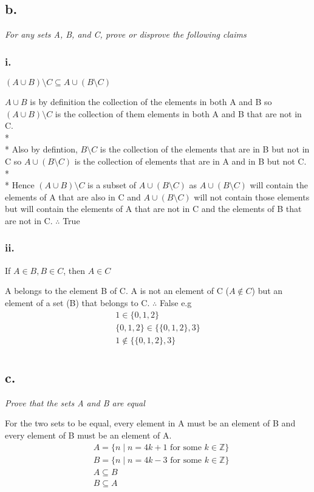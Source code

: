 \documentclass[a4paper, 12pt]{article}
\begin{document}
\subsection*{b.}
\begin{center} \textit{For any sets A, B, and C, prove or disprove the following claims} \end{center}
\subsubsection*{i.}
\begin{center} $(A \cup B) \setminus C \subseteq A \cup (B \setminus C)$ \end{center}
$A \cup B$ is by definition the collection of the elements in both A and B so $(A \cup B) \setminus C$ 
is the collection of them elements in both A and B that are not in C. 
\\*
\\*
Also by defintion, $B \setminus C$ is the collection of the elements that are in B but not in C so $A \cup (B \setminus C)$
is the collection of elements that are in A and in B but not C. 
\\*
\\*
Hence $(A \cup B) \setminus C$ is a subset of $A \cup (B \setminus C)$ as $A \cup (B \setminus C)$ will
contain the elements of A that are also in C and $A \cup (B \setminus C)$ will not contain those elements
but will contain the elements of A that are not in C and the elements of B that are not in C. $\therefore$ True

\subsubsection*{ii.}
\begin{center} If $A \in B, B \in C$, then $A \in C$ \end{center}
A belongs to the element B of C. A is not an element of C ($A \notin C$) but an element of a set (B) that belongs to C. $\therefore$ False
e.g
\begin{align*}
    1 \in \{0,1,2\} \\
    \{0,1,2\} \in \{\{0,1,2\}, 3\} \\
    1 \notin \{\{0,1,2\}, 3\} \\
\end{align*}

\newpage
\subsection*{c.}
\begin{center} \textit{Prove that the sets A and B are equal} \end{center}
For the two sets to be equal, every element in A must be an element of B and every element of B must be an element of A.
\begin{align*}
    &A = \{n \mid n = 4k+1 \text{ for some } k \in \mathbb{Z}\} \\
    &B = \{n \mid n = 4k-3 \text{ for some } k \in \mathbb{Z}\} \\ 
    &A \subseteq B \\
    &B \subseteq A \\
\end{align*}
\end{document}
